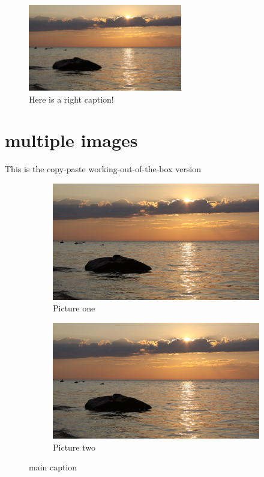 \documentclass[12pt]{report}
\begin{document}
\begin{figure} %
\caption{Here is a right caption!}
\includegraphics[width=0.6\textwidth]{demo}
\end{figure}

\section{multiple images}
This is the copy-paste working-out-of-the-box version 
\begin{figure}[h!]
\centering
    \begin{subfigure}[t]{0.35\textwidth}
        \centering
        \includegraphics[width=\textwidth]{demo}
        \caption{Picture one}
        \label{fig:one}
    \end{subfigure}
    \begin{subfigure}[t]{0.35\textwidth}
        \centering
        \includegraphics[width=\textwidth]{demo}
        \caption{Picture two}
        \label{fig:two}
    \end{subfigure}
\caption{main caption}
\label{fig:main}
\end{figure}

\clearpage %
\end{document}
